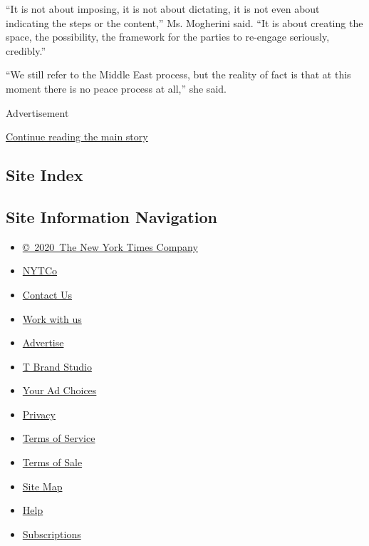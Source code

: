 ``It is not about imposing, it is not about dictating, it is not even
about indicating the steps or the content,'' Ms. Mogherini said. ``It is
about creating the space, the possibility, the framework for the parties
to re-engage seriously, credibly.''

``We still refer to the Middle East process, but the reality of fact is
that at this moment there is no peace process at all,'' she said.

Advertisement

\protect\hyperlink{after-bottom}{Continue reading the main story}

\hypertarget{site-index}{%
\subsection{Site Index}\label{site-index}}

\hypertarget{site-information-navigation}{%
\subsection{Site Information
Navigation}\label{site-information-navigation}}

\begin{itemize}
\tightlist
\item
  \href{https://help.nytimes3xbfgragh.onion/hc/en-us/articles/115014792127-Copyright-notice}{©~2020~The
  New York Times Company}
\end{itemize}

\begin{itemize}
\tightlist
\item
  \href{https://www.nytco.com/}{NYTCo}
\item
  \href{https://help.nytimes3xbfgragh.onion/hc/en-us/articles/115015385887-Contact-Us}{Contact
  Us}
\item
  \href{https://www.nytco.com/careers/}{Work with us}
\item
  \href{https://nytmediakit.com/}{Advertise}
\item
  \href{http://www.tbrandstudio.com/}{T Brand Studio}
\item
  \href{https://www.nytimes3xbfgragh.onion/privacy/cookie-policy\#how-do-i-manage-trackers}{Your
  Ad Choices}
\item
  \href{https://www.nytimes3xbfgragh.onion/privacy}{Privacy}
\item
  \href{https://help.nytimes3xbfgragh.onion/hc/en-us/articles/115014893428-Terms-of-service}{Terms
  of Service}
\item
  \href{https://help.nytimes3xbfgragh.onion/hc/en-us/articles/115014893968-Terms-of-sale}{Terms
  of Sale}
\item
  \href{https://spiderbites.nytimes3xbfgragh.onion}{Site Map}
\item
  \href{https://help.nytimes3xbfgragh.onion/hc/en-us}{Help}
\item
  \href{https://www.nytimes3xbfgragh.onion/subscription?campaignId=37WXW}{Subscriptions}
\end{itemize}
